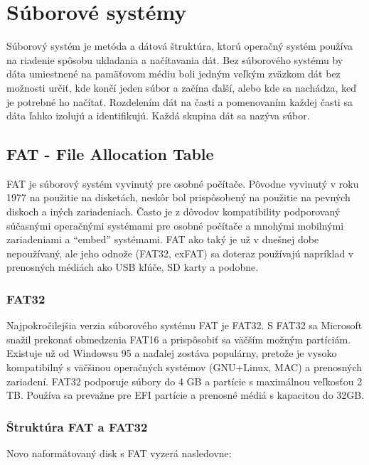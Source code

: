 \documentclass[12pt,oneside,slovak,a4paper]{article}
\begin{document}

\section{Súborové systémy}
Súborový systém je metóda a dátová štruktúra, ktorú operačný systém používa na riadenie spôsobu ukladania a načítavania dát. Bez súborového systému by dáta umiestnené na pamäťovom médiu boli jedným veľkým zväzkom dát bez možnosti určiť, kde končí jeden súbor a začína ďalší, alebo kde sa nachádza, keď je potrebné ho načítať. Rozdelením dát na časti a pomenovaním každej časti sa dáta ľahko izolujú a identifikujú. Každá skupina dát sa nazýva súbor.

\subsection{FAT - File Allocation Table}
FAT je súborový systém vyvinutý pre osobné počítače. Pôvodne vyvinutý v roku 1977 na použitie na disketách, neskôr bol prispôsobený na použitie na pevných diskoch a iných zariadeniach. Často je z dôvodov kompatibility podporovaný súčasnými operačnými systémami pre osobné počítače a mnohými mobilnými zariadeniami a ``embed'' systémami. FAT ako taký je už v dnešnej dobe nepoužívaný, ale jeho odnože (FAT32, exFAT) sa doteraz používajú napríklad v prenosných médiách ako USB kľúče, SD karty a podobne.

\subsubsection{FAT32}
Najpokročilejšia verzia súborového systému FAT je FAT32. S FAT32 sa Microsoft snažil prekonať obmedzenia FAT16 a prispôsobiť sa väčším možným partíciám. Existuje už od Windowsu 95 a naďalej zostáva populárny, pretože je vysoko kompatibilný s väčšinou operačných systémov (GNU+Linux, MAC) a prenosných zariadení. FAT32 podporuje súbory do 4 GB a partície s maximálnou veľkosťou 2 TB. Používa sa prevažne pre EFI partície a prenosné médiá s kapacitou do 32GB.

\subsubsection{Štruktúra FAT a FAT32}
Novo naformátovaný disk s FAT vyzerá nasledovne:
\end{document}
